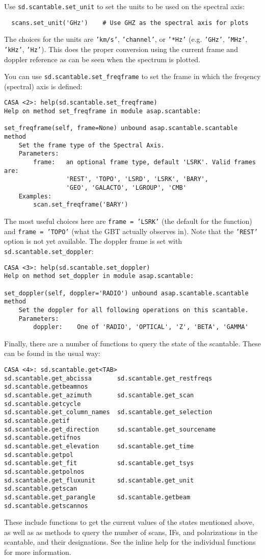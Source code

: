 Use {\tt sd.scantable.set\_unit} to set the units to be used on 
the spectral axis:
\small
\begin{verbatim}
  scans.set_unit('GHz')    # Use GHZ as the spectral axis for plots
\end{verbatim}
\normalsize
The choices for the units are {\tt 'km/s'}, {\tt 'channel'}, or
{\tt '*Hz'} (e.g. {\tt 'GHz'}, {\tt 'MHz'}, {\tt 'kHz'}, {\tt 'Hz'}).
This does the proper conversion using the current frame and doppler
reference as can be seen when the spectrum is plotted.

You can use {\tt sd.scantable.set\_freqframe}
to set the frame in which the freqency (spectral) axis is defined:
\small
\begin{verbatim}
CASA <2>: help(sd.scantable.set_freqframe)
Help on method set_freqframe in module asap.scantable:

set_freqframe(self, frame=None) unbound asap.scantable.scantable method
    Set the frame type of the Spectral Axis.
    Parameters:
        frame:   an optional frame type, default 'LSRK'. Valid frames are:
                 'REST', 'TOPO', 'LSRD', 'LSRK', 'BARY',
                 'GEO', 'GALACTO', 'LGROUP', 'CMB'
    Examples:
        scan.set_freqframe('BARY')
\end{verbatim}
\normalsize
The most useful choices here are {\tt frame = 'LSRK'} (the default for
the function) and {\tt frame = 'TOPO'} (what the GBT actually observes
in).  Note that the {\tt 'REST'} option is not yet available.
The doppler frame is set with {\tt sd.scantable.set\_doppler}:
\small
\begin{verbatim}
CASA <3>: help(sd.scantable.set_doppler)
Help on method set_doppler in module asap.scantable:

set_doppler(self, doppler='RADIO') unbound asap.scantable.scantable method
    Set the doppler for all following operations on this scantable.
    Parameters:
        doppler:    One of 'RADIO', 'OPTICAL', 'Z', 'BETA', 'GAMMA'
\end{verbatim}
\normalsize

Finally, there are a number of functions to query the state of the
scantable.  These can be found in the usual way:
\small
\begin{verbatim}
CASA <4>: sd.scantable.get<TAB>
sd.scantable.get_abcissa       sd.scantable.get_restfreqs     sd.scantable.getbeamnos
sd.scantable.get_azimuth       sd.scantable.get_scan          sd.scantable.getcycle
sd.scantable.get_column_names  sd.scantable.get_selection     sd.scantable.getif
sd.scantable.get_direction     sd.scantable.get_sourcename    sd.scantable.getifnos
sd.scantable.get_elevation     sd.scantable.get_time          sd.scantable.getpol
sd.scantable.get_fit           sd.scantable.get_tsys          sd.scantable.getpolnos
sd.scantable.get_fluxunit      sd.scantable.get_unit          sd.scantable.getscan
sd.scantable.get_parangle      sd.scantable.getbeam           sd.scantable.getscannos
\end{verbatim}
\normalsize
These include functions to get the current values of the states
mentioned above, as well as
as methods to query the number of scans, IFs, and polarizations
in the scantable, and their designations.  See the
inline help for the individual functions for more information.


